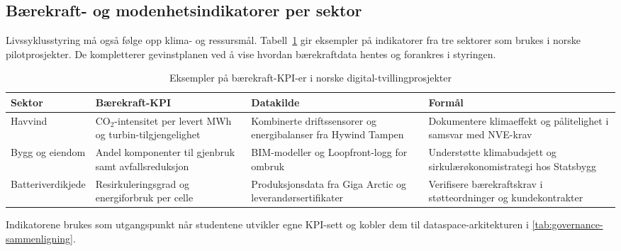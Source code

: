 \subsection*{Bærekraft- og modenhetsindikatorer per sektor}
Livssyklusstyring må også følge opp klima- og ressursmål. Tabell~\ref{tab:baerekraft-kpi} gir eksempler på indikatorer fra tre sektorer som brukes i norske pilotprosjekter. De kompletterer gevinstplanen ved å vise hvordan bærekraftdata hentes og forankres i styringen.

\begin{table}[h]
    \centering
    \caption{Eksempler på bærekraft-KPI-er i norske digital-tvillingprosjekter}
    \label{tab:baerekraft-kpi}
    \begin{tabular}{p{2.9cm}p{3.6cm}p{3.2cm}p{3.3cm}}
        \toprule
        Sektor & Bærekraft-KPI & Datakilde & Formål \\
        \midrule
        Havvind & CO$_2$-intensitet per levert MWh og turbin-tilgjengelighet & Kombinerte driftssensorer og energibalanser fra Hywind Tampen & Dokumentere klimaeffekt og pålitelighet i samsvar med NVE-krav\citep{equinor2023hywindtampen,nve2023havvindfakta} \\
        Bygg og eiendom & Andel komponenter til gjenbruk samt avfallsreduksjon & BIM-modeller og Loopfront-logg for ombruk & Understøtte klimabudsjett og sirkulærøkonomistrategi hos Statsbygg\citep{statsbygg2023loopfront,regjeringen2021sirkulaer} \\
        Batteriverdikjede & Resirkuleringsgrad og energiforbruk per celle & Produksjonsdata fra Giga Arctic og leverandørsertifikater & Verifisere bærekraftskrav i støtteordninger og kundekontrakter\citep{freyr2024giga,enova2023batteri} \\
        \bottomrule
    \end{tabular}
\end{table}

Indikatorene brukes som utgangspunkt når studentene utvikler egne KPI-sett og kobler dem til dataspace-arkitekturen i \autoref{tab:governance-sammenligning}.


